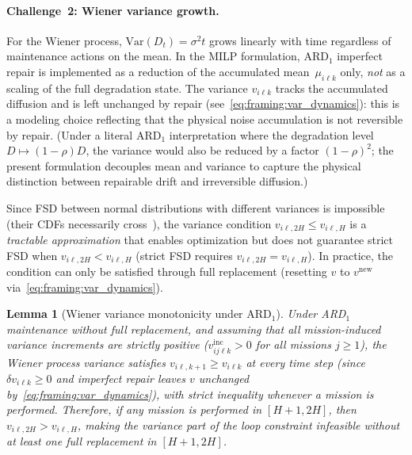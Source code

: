\documentclass[11pt,a4paper]{article}
\theoremstyle{plain}
\newtheorem{lemma}[theorem]{Lemma}
\theoremstyle{definition}
\theoremstyle{remark}
\begin{document}
\paragraph{Challenge~2: Wiener variance growth.}
For the Wiener process, $\mathrm{Var}(D_t) = \sigma^2 t$ grows linearly with
time regardless of maintenance actions on the mean.
In the MILP formulation, ARD$_1$ imperfect repair is implemented as a
reduction of the accumulated mean~$\mu_{i\ell k}$ only, \emph{not} as a
scaling of the full degradation state.
The variance $v_{i\ell k}$ tracks the accumulated diffusion and is left
unchanged by repair (see~\eqref{eq:framing:var_dynamics}):
this is a modeling choice reflecting that the physical noise accumulation
is not reversible by repair.
(Under a literal ARD$_1$ interpretation where the degradation level
$D \mapsto (1-\rho)D$, the variance would also be reduced by a factor
$(1-\rho)^2$; the present formulation decouples mean and variance to
capture the physical distinction between repairable drift and irreversible
diffusion.)

Since FSD between normal distributions with different variances is impossible
(their CDFs necessarily cross~\cite[Ex.~1.A.7]{shaked2007}), the variance
condition $v_{i\ell,2H} \le v_{i\ell,H}$ is a \emph{tractable approximation}
that enables optimization but does not guarantee strict FSD when
$v_{i\ell,2H} < v_{i\ell,H}$ (strict FSD requires $v_{i\ell,2H} = v_{i\ell,H}$).
In practice, the condition can only be satisfied through full replacement
(resetting $v$ to $v^{\mathrm{new}}$ via~\eqref{eq:framing:var_dynamics}).

\begin{lemma}[Wiener variance monotonicity under ARD$_1$]\label{lem:wiener_infeasibility}
Under ARD$_1$ maintenance without full replacement, and assuming that all
mission-induced variance increments are strictly positive
($v^{\mathrm{inc}}_{ij\ell k} > 0$ for all missions $j \ge 1$),
the Wiener process variance
satisfies $v_{i\ell,k+1} \ge v_{i\ell k}$ at every time step
(since $\delta v_{i\ell k} \ge 0$ and imperfect repair leaves $v$ unchanged
by~\eqref{eq:framing:var_dynamics}), with strict inequality whenever a mission is
performed. Therefore, if any mission is performed
in $[H{+}1, 2H]$, then $v_{i\ell,2H} > v_{i\ell,H}$, making the variance
part of the loop constraint infeasible without at least one full replacement
in $[H{+}1, 2H]$.
\end{lemma}
\end{document}
